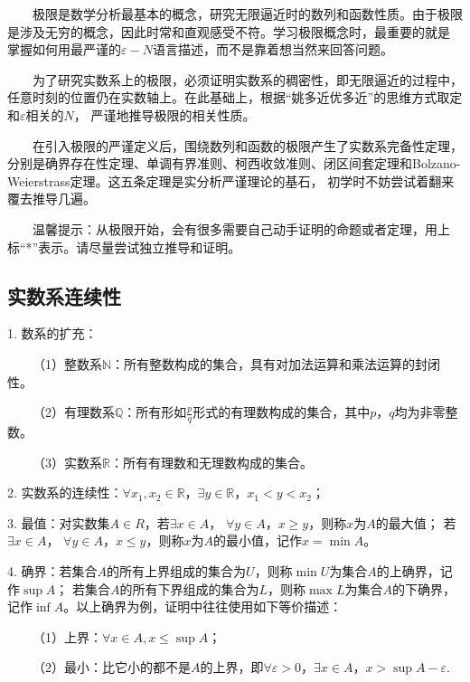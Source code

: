 \begin{tcolorbox}[colback=red!5,colframe=red!75!black]
    ~~~~极限是数学分析最基本的概念，研究无限逼近时的数列和函数性质。由于极限是涉及无穷的概念，因此时常和直观感受不符。学习极限概念时，最重要的就是
    掌握如何用最严谨的$\varepsilon-N$语言描述，而不是靠着想当然来回答问题。

    ~~~~为了研究实数系上的极限，必须证明实数系的稠密性，即无限逼近的过程中，任意时刻的位置仍在实数轴上。在此基础上，根据“姚多近优多近”的思维方式取定和$\varepsilon$相关的$N$，
    严谨地推导极限的相关性质。

    ~~~~在引入极限的严谨定义后，围绕数列和函数的极限产生了实数系完备性定理，分别是确界存在性定理、单调有界准则、柯西收敛准则、闭区间套定理和Bolzano-Weierstrass定理。这五条定理是实分析严谨理论的基石，
    初学时不妨尝试着翻来覆去推导几遍。

    ~~~~温馨提示：从极限开始，会有很多需要自己动手证明的命题或者定理，用上标“*”表示。请尽量尝试独立推导和证明。

\end{tcolorbox}

\subsection{实数系连续性}

1. 数系的扩充：

~~~~（1）整数系$\mathbb{N}$：所有整数构成的集合，具有对加法运算和乘法运算的封闭性。

~~~~（2）有理数系$\mathbb{Q}$：所有形如$\frac{p}{q}$形式的有理数构成的集合，其中$p$，$q$均为非零整数。

~~~~（3）实数系$\mathbb{R}$：所有有理数和无理数构成的集合。

2. 实数系的连续性：$\forall x_1,x_2\in \mathbb{R}$，$\exists y \in \mathbb{R}$，$x_1<y<x_2$；

3. 最值：对实数集$A \in R$，若$\exists x \in A$， $\forall y \in A$，$x \geqslant y$，则称$x$为$A$的最大值；
若$\exists x \in A$， $\forall y \in A$，$x \leqslant y$，则称$x$为$A$的最小值，记作$x = \min A$。

4. 确界：若集合$A$的所有上界组成的集合为$U$，则称$\min U$为集合$A$的上确界，记作$\sup A$；
若集合$A$的所有下界组成的集合为$L$，则称$\max L$为集合$A$的下确界，记作$\inf A$。以上确界为例，证明中往往使用如下等价描述：

~~~~（1）上界：$\forall x \in A, x \leqslant \sup A$；

~~~~（2）最小：比它小的都不是$A$的上界，即$\forall \varepsilon>0$，$\exists x \in A$，$x>\sup A-\varepsilon$.

